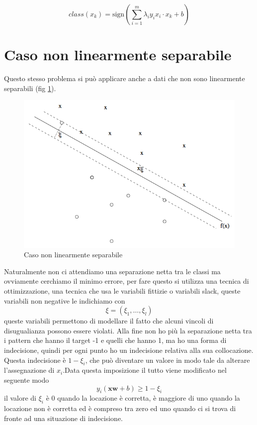 \begin{equation}
class(x_k) = \text{sign} \left( \sum_{i=1}^m \lambda_i y_i x_i \cdot x_k + b\right)
\end{equation}

\section{Caso non linearmente separabile}
Questo stesso problema si può applicare anche a dati che non sono linearmente separabili (fig \ref{svm2}).
\begin{figure}
\centering
\includegraphics[scale=0.5]{img/svm2.png}
\caption{Caso non linearmente separabile}
\label{svm2}
\end{figure}
Naturalmente non ci attendiamo una separazione netta tra le classi ma ovviamente cerchiamo il minimo errore, per fare questo si utilizza una tecnica di ottimizzazione, una tecnica che usa le variabili fittizie o variabili slack, queste variabili non negative le indichiamo con
\begin{equation}
\xi = (\xi_1, \dots, \xi_l)
\end{equation}
queste variabili permettono di modellare il fatto che alcuni vincoli di disugualianza possono essere violati.
Alla fine non ho più la separazione netta tra i pattern che hanno il target -1 e quelli che hanno 1, ma ho una forma di indecisione, quindi per ogni punto ho un indecisione relativa alla sua collocazione. Questa indecisione è $1-\xi_i$, che può diventare un valore in modo tale da alterare l'assegnazione di $x_i$.Data questa imposizione il tutto viene modificato nel seguente modo
\begin{equation}
y_i(\mathbf{x}\mathbf{w} + b) \geq 1 - \xi_i
\end{equation}
il valore di $\xi_i$ è 0 quando la locazione è corretta, è maggiore di uno quando la locazione non è corretta ed è compreso tra zero ed uno quando ci si trova di fronte ad una situazione di indecisione.\\

